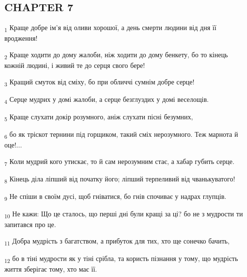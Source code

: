 \subsection{CHAPTER 7}
\begin{tcolorbox}
\textsubscript{1} Краще добре ім'я від оливи хорошої, а день смерти людини від дня її вродження!
\end{tcolorbox}
\begin{tcolorbox}
\textsubscript{2} Краще ходити до дому жалоби, ніж ходити до дому бенкету, бо то кінець кожній людині, і живий те до серця свого бере!
\end{tcolorbox}
\begin{tcolorbox}
\textsubscript{3} Кращий смуток від сміху, бо при обличчі сумнім добре серце!
\end{tcolorbox}
\begin{tcolorbox}
\textsubscript{4} Серце мудрих у домі жалоби, а серце безглуздих у домі веселощів.
\end{tcolorbox}
\begin{tcolorbox}
\textsubscript{5} Краще слухати докір розумного, аніж слухати пісні безумних,
\end{tcolorbox}
\begin{tcolorbox}
\textsubscript{6} бо як тріскот тернини під горщиком, такий сміх нерозумного. Теж марнота й оце!...
\end{tcolorbox}
\begin{tcolorbox}
\textsubscript{7} Коли мудрий кого утискає, то й сам нерозумним стає, а хабар губить серце.
\end{tcolorbox}
\begin{tcolorbox}
\textsubscript{8} Кінець діла ліпший від початку його; ліпший терпеливий від чванькуватого!
\end{tcolorbox}
\begin{tcolorbox}
\textsubscript{9} Не спіши в своїм дусі, щоб гніватися, бо гнів спочиває у надрах глупців.
\end{tcolorbox}
\begin{tcolorbox}
\textsubscript{10} Не кажи: Що це сталось, що перші дні були кращі за ці? бо не з мудрости ти запитався про це.
\end{tcolorbox}
\begin{tcolorbox}
\textsubscript{11} Добра мудрість з багатством, а прибуток для тих, хто ще сонечко бачить,
\end{tcolorbox}
\begin{tcolorbox}
\textsubscript{12} бо в тіні мудрости як у тіні срібла, та користь пізнання у тому, що мудрість життя зберігає тому, хто має її.
\end{tcolorbox}
